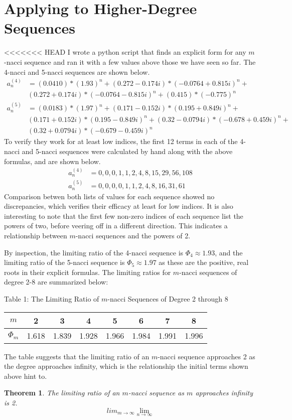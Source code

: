 \documentclass[11pt]{article}
\newtheorem{theorem}{Theorem}[section]
\begin{document}
\section{Applying to Higher-Degree Sequences}
<<<<<<< HEAD
I wrote a python script that finds an explicit form for any \(m\)-nacci sequence and ran it with a few values above those we have seen so far. The 4-nacci and 5-nacci sequences are shown below. 
\begin{align*}
    a_n^{(4)} &= (0.0410)*(1.93)^n + (0.272 - 0.174i)*(-0.0764 + 0.815i)^n + \\ &(0.272 + 0.174i)*(-0.0764 - 0.815i)^n + (0.415)*(-0.775)^n \\
    a_n^{(5)} &= (0.0183)*(1.97)^n + (0.171 - 0.152i)*(0.195 + 0.849i)^n + \\ & (0.171 + 0.152i)*(0.195 - 0.849i)^n + (0.32 - 0.0794i)*(-0.678 + 0.459i)^n + \\ & (0.32 + 0.0794i)*(-0.679 - 0.459i)^n
\end{align*}
To verify they work for at least low indices, the first 12 terms in each of the 4-nacci and 5-nacci sequences were calculated by hand along with the above formulas, and are shown below. 
\begin{align*}
    a_{n}^{(4)}&= 0,0,0,1,1,2,4,8,15,29,56,108 \\
    a_{n}^{(5)}&= 0,0,0,0,1,1,2,4,8,16,31,61
\end{align*}
Comparison betwen both lists of values for each sequence showed no discrepancies, which verifies their efficacy at least for low indices. It is also interesting to note that the first few non-zero indices of each sequence list the powers of two, before veering off in a different direction. This indicates a relationship between \(m\)-nacci sequences and the powers of 2.

By inspection, the limiting ratio of the 4-nacci sequence is \(\Phi_{4}\approx1.93\), and the limiting ratio of the 5-nacci sequence is \(\Phi_{5}\approx1.97\) as these are the positive, real roots in their explicit formulas. The limiting ratios for \(m\)-nacci sequences of degree 2-8 are summarized below:
\begin{center}
    Table 1: The Limiting Ratio of \(m\)-nacci Sequences of Degree 2 through 8
    \begin{tabular}{|c|c|c|c|c|c|c|c|} 
     \hline
     \(m\) & 2 & 3 & 4 & 5 & 6 & 7 & 8 \\ 
     \hline
     \(\Phi_m\) & 1.618 & 1.839 & 1.928 & 1.966 & 1.984 & 1.991 & 1.996 \\
     \hline
    \end{tabular}
    \end{center}
The table suggests that the limiting ratio of an \(m\)-nacci sequence approaches 2 as the degree approaches infinity, which is the relationship the initial terms shown above hint to. 
\begin{theorem}
    The limiting ratio of an \(m\)-nacci sequence as \(m\) approaches infinity is 2. 
    \[lim_{m\to\infty}\lim_{n\to\infty}\]
\end{theorem}
\end{document}
